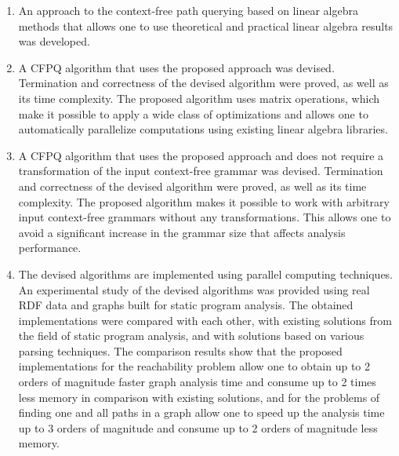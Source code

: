 {}
\begin{enumerate}[beginpenalty=10000] %
    \item An approach to the context-free path querying based on linear algebra methods that allows one to use theoretical and practical linear algebra results was developed.
    \item A CFPQ algorithm that uses the proposed approach was devised. Termination and correctness of the devised algorithm were proved, as well as its time complexity. The proposed algorithm uses matrix operations, which make it possible to apply a wide class of optimizations and allows one to automatically parallelize computations using existing linear algebra libraries.
    \item A CFPQ algorithm that uses the proposed approach and does not require a transformation of the input context-free grammar was devised. Termination and correctness of the devised algorithm were proved, as well as its time complexity. The proposed algorithm makes it possible to work with arbitrary input context-free grammars without any transformations. This allows one to avoid a significant increase in the grammar size that affects analysis performance.
    \item The devised algorithms are implemented using parallel computing techniques. An experimental study of the devised algorithms was provided using real RDF data and graphs built for static program analysis. The obtained implementations were compared with each other, with existing solutions from the field of static program analysis, and with solutions based on various parsing techniques. The comparison results show that the proposed implementations for the reachability problem allow one to obtain up to 2 orders of magnitude faster graph analysis time and consume up to 2 times less memory in comparison with existing solutions, and for the problems of finding one and all paths in a graph allow one to speed up the analysis time up to 3 orders of magnitude and consume up to 2 orders of magnitude less memory.
\end{enumerate}

